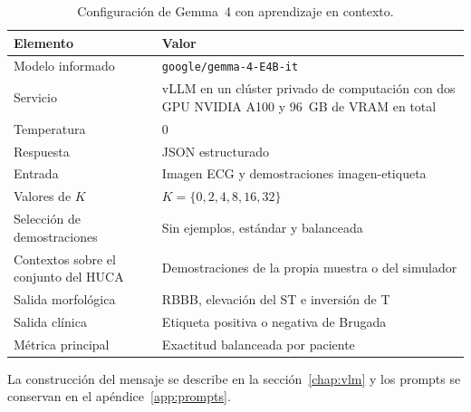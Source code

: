 \begin{table}[H]
  \centering
  \small
  \begin{tabularx}{0.94\textwidth}{p{4.4cm}X}
    \toprule
    Elemento & Valor \\
    \midrule
    Modelo informado & \texttt{google/gemma-4-E4B-it} \\
    Servicio & vLLM en un clúster privado de computación con dos GPU NVIDIA A100 y 96~GB de VRAM en total \\
    Temperatura & 0 \\
    Respuesta & JSON estructurado \\
    Entrada & Imagen ECG y demostraciones imagen-etiqueta \\
    Valores de \(K\) & \(K=\{0,2,4,8,16,32\}\) \\
    Selección de demostraciones & Sin ejemplos, estándar y balanceada \\
    Contextos sobre el conjunto del HUCA & Demostraciones de la propia muestra o del simulador \\
    Salida morfológica & RBBB, elevación del ST e inversión de T \\
    Salida clínica & Etiqueta positiva o negativa de Brugada \\
    Métrica principal & Exactitud balanceada por paciente \\
    \bottomrule
  \end{tabularx}
  \caption{Configuración de Gemma~4 con aprendizaje en contexto.}
  \label{tab:config_vlm_appendix}
\end{table}

La construcción del mensaje se describe en la sección~\ref{chap:vlm} y los prompts se conservan en el apéndice~\ref{app:prompts}.
